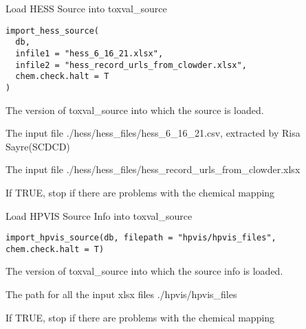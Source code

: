 \documentclass[letterpaper]{book}
\begin{document}
%
\begin{Description}\relax
Load HESS Source into toxval\_source
\end{Description}
%
\begin{Usage}
\begin{verbatim}
import_hess_source(
  db,
  infile1 = "hess_6_16_21.xlsx",
  infile2 = "hess_record_urls_from_clowder.xlsx",
  chem.check.halt = T
)
\end{verbatim}
\end{Usage}
%
\begin{Arguments}
\begin{ldescription}
\item[\code{db}] The version of toxval\_source into which the source is loaded.

\item[\code{infile1}] The input file ./hess/hess\_files/hess\_6\_16\_21.csv, extracted by Risa Sayre(SCDCD)

\item[\code{infile2}] The input file ./hess/hess\_files/hess\_record\_urls\_from\_clowder.xlsx

\item[\code{chem.check.halt}] If TRUE, stop if there are problems with the chemical mapping
\end{ldescription}
\end{Arguments}
%
\begin{Description}\relax
Load HPVIS Source Info into toxval\_source
\end{Description}
%
\begin{Usage}
\begin{verbatim}
import_hpvis_source(db, filepath = "hpvis/hpvis_files", chem.check.halt = T)
\end{verbatim}
\end{Usage}
%
\begin{Arguments}
\begin{ldescription}
\item[\code{db}] The version of toxval\_source into which the source info is loaded.

\item[\code{filepath}] The path for all the input xlsx files ./hpvis/hpvis\_files

\item[\code{chem.check.halt}] If TRUE, stop if there are problems with the chemical mapping
\end{ldescription}
\end{Arguments}
\end{document}
